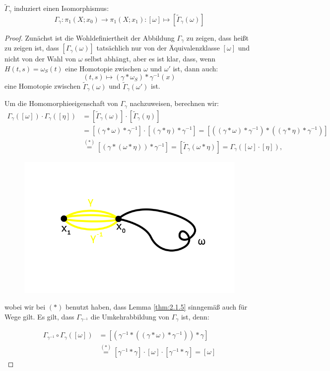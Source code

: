 \documentclass[a4paper,10pt]{scrartcl}
\begin{document}
\begin{st}
 $\tilde \Gamma_\gamma$ induziert einen Isomorphismus:
\[
 \Gamma_\gamma: \pi_1(X;x_0)\to \pi_1(X;x_1): [\omega] \mapsto [\tilde \Gamma_{\gamma}(\omega)]
\]
\end{st}
\begin{proof}
 Zunächst ist die Wohldefiniertheit der Abbildung $\Gamma_\gamma$ zu zeigen, dass heißt zu zeigen ist, dass $[\Gamma_{\gamma} (\omega)]$ tatsächlich nur von der Äquivalenzklasse $[\omega]$ und nicht von der Wahl von $\omega$ selbst abhängt, aber es ist klar, dass, wenn $H(t,s)=\omega_S(t)$ eine Homotopie zwischen $\omega$ und $\omega'$ ist, dann auch:
\[
 (t,s)\mapsto (\gamma*\omega_S)*\gamma^{-1}(x)
\]
eine Homotopie zwischen $\tilde \Gamma_{\gamma}(\omega)$ und $\tilde \Gamma_{\gamma}(\omega')$ ist. 

Um die Homomorphieeigenschaft von $\Gamma_{\gamma}$ nachzuweisen, berechnen wir: 
\begin{align*}
 \Gamma_{\gamma}([\omega])\cdot \Gamma_{\gamma} ([\eta])&=[\tilde \Gamma_{\gamma}(\omega)]\cdot [ \tilde \Gamma_{\gamma}(\eta)]\\
&=[(\gamma*\omega)*\gamma^{-1}]\cdot [(\gamma*\eta)*\gamma^{-1}]=[((\gamma*\omega)*\gamma^{-1})*((\gamma*\eta)*\gamma^{-1})]\\
&\stackrel{(*)}=[(\gamma*(\omega*\eta))*\gamma^{-1}]=[\tilde \Gamma_\gamma (\omega*\eta)]=\Gamma_\gamma([\omega] \cdot [\eta]),
\end{align*}

\begin{figure}[ht]
\centering
\includegraphics[scale=0.3]{fig67.png}
\caption{}
\end{figure}

wobei wir bei $(*)$ benutzt haben, dass Lemma \ref{thm:2.1.5} sinngemäß auch für Wege gilt. Es gilt, dass $\Gamma_{\gamma^{-1}}$ die Umkehrabbildung von $\Gamma_\gamma$ ist, denn:

\begin{align*}
 \Gamma_{\gamma^{-1}}\circ \Gamma_\gamma ([\omega])&=[(\gamma^{-1}*((\gamma*\omega)*\gamma^{-1}))*\gamma]\\
 &\stackrel{(*)}=[\gamma^{-1}*\gamma]\cdot [\omega]\cdot [\gamma^{-1} * \gamma]=[\omega]
\end{align*}
\end{proof}
\end{document}
